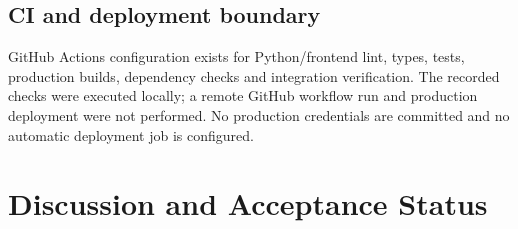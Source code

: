 \documentclass[12pt,a4paper,twoside]{report}
\begin{document}
\subsection*{CI and deployment boundary}

GitHub Actions configuration exists for Python/frontend lint, types, tests, production builds, dependency checks and integration verification. The recorded checks were executed locally; a remote GitHub workflow run and production deployment were not performed. No production credentials are committed and no automatic deployment job is configured.

\section{Discussion and Acceptance Status}
\end{document}
